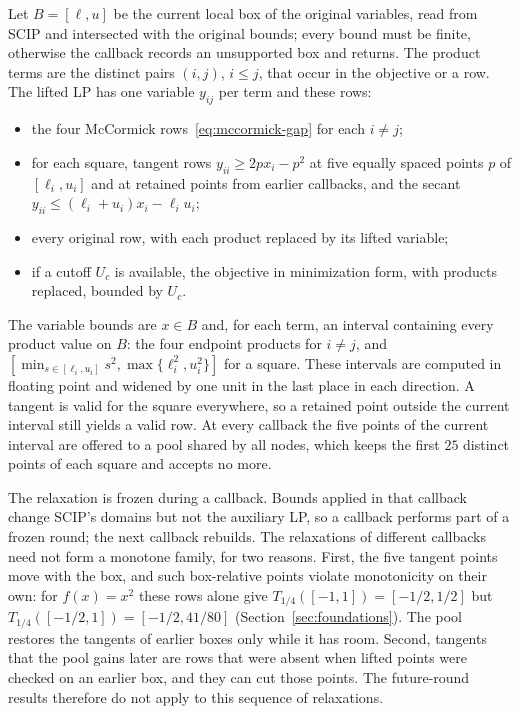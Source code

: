 Let $B=[\ell,u]$ be the current local box of the original variables, read
from SCIP and intersected with the original bounds; every bound must be
finite, otherwise the callback records an unsupported box and returns. The
product terms are the distinct pairs $(i,j)$, $i\le j$, that occur in the
objective or a row. The lifted LP has one variable $y_{ij}$ per term and these
rows:
\begin{itemize}
\item the four McCormick rows~\eqref{eq:mccormick-gap} for each $i\ne j$;
\item for each square, tangent rows $y_{ii}\ge2px_i-p^2$ at five equally spaced
points $p$ of $[\ell_i,u_i]$ and at retained points from earlier callbacks, and
the secant $y_{ii}\le(\ell_i+u_i)x_i-\ell_iu_i$;
\item every original row, with each product replaced by its lifted variable;
\item if a cutoff $U_c$ is available, the objective in minimization form, with
products replaced, bounded by $U_c$.
\end{itemize}
The variable bounds are $x\in B$ and, for each term, an interval containing
every product value on $B$: the four endpoint products for $i\ne j$, and
$[\min_{s\in[\ell_i,u_i]}s^2,\max\{\ell_i^2,u_i^2\}]$ for a square. These
intervals are computed in floating point and widened by one unit in the last
place in each direction. A tangent is valid for the square everywhere, so a
retained point outside the current interval still yields a valid row. At
every callback the five points of the current interval are offered to a
pool shared by all nodes, which keeps the first $25$ distinct points of
each square and accepts no more.

The relaxation is frozen during a callback. Bounds applied in that callback
change SCIP's domains but not the auxiliary LP, so a callback performs part
of a frozen round; the next callback rebuilds. The relaxations of different
callbacks need not form a monotone family, for two reasons. First, the five
tangent points move with the box, and such box-relative points violate
monotonicity on their own: for $f(x)=x^2$ these rows alone give
$T_{1/4}([-1,1])=[-1/2,1/2]$ but $T_{1/4}([-1/2,1])=[-1/2,41/80]$
(Section~\ref{sec:foundations}). The pool restores the tangents of earlier
boxes only while it has room. Second, tangents that the pool gains later are
rows that were absent when lifted points were checked on an earlier box, and
they can cut those points. The future-round results therefore do not apply
to this sequence of relaxations.

